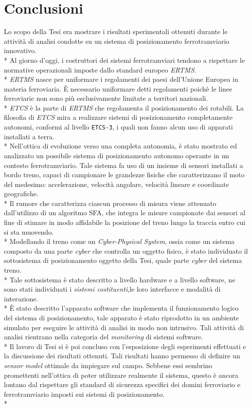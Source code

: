 \chapter{Conclusioni}
Lo scopo della Tesi era mostrare i risultati sperimentali ottenuti durante le attivit\`a di analisi condotte su un sistema di posizionamento ferrotramviario innovativo.\\*
Al giorno d'oggi, i costruttori dei sistemi ferrotramviari tendono a rispettare le normative operazionali imposte dallo standard europeo \emph{ERTMS}.\\*
\emph{ERTMS} nasce per uniformare i regolamenti dei paesi dell'Unione Europea in materia ferroviaria. \`E necessario uniformare detti regolamenti poich\`e le linee ferroviarie non sono pi\`u esclusivamente limitate a territori nazionali.\\*
\emph{ETCS} \`e la parte di \emph{ERTMS} che regolamenta il posizionamento dei rotabili. La filosofia di \emph{ETCS} mira a realizzare sistemi di posizionamento completamente autonomi, conformi al livello \texttt{ETCS-3}, i quali non fanno alcun uso di apparati installati a terra.\\*
Nell'ottica di evoluzione verso una completa autonomia, \`e stato mostrato ed analizzato un possibile sistema di posizionamento autonomo operante in un contesto ferrotramviario. Tale sistema fa uso di un insieme di sensori installati a bordo treno, capaci di campionare le grandezze fisiche che caratterizzano il moto del medesimo: accelerazione, velocit\`a angolare, velocit\`a lineare e coordinate geografiche.\\*
Il rumore che caratterizza ciascun processo di misura viene attenuato dall'utilizzo di un algoritmo SFA, che integra le misure campionate dai sensori al fine di stimare in modo affidabile la posizione del treno lungo la traccia entro cui si sta muovendo.\\*
Modellando il treno come un \emph{Cyber-Physical System}, ossia come un sistema composto da una parte \emph{cyber} che controlla un oggetto fisico, \`e stato individuato il sottosistema di posizionamento oggetto della Tesi, quale parte \emph{cyber} del sistema treno.\\*
Tale sottosistema \`e stato descritto a livello hardware e a livello software, ne sono stati individuati i \emph{sistemi costituenti},le loro interfacce e modalit\`a di interazione.\\*
\`E stato descritto l'apparato software che implementa il funzionamento logico del sistema di posizionamento, tale apparato \`e stato riprodotto in un ambiente simulato per eseguire le attivit\`a di analisi in modo non intrusivo. Tali attivit\`a di analisi rientrano nella categoria del \emph{monitoring} di sistemi software.\\*
Il lavoro di Tesi si \`e poi concluso con l'esposizione degli esperimenti effettuati e la discussione dei risultati ottenuti. Tali risultati hanno permesso di definire un \emph{sensor model} ottimale da impiegare sul campo. Sebbene essi sembrino promettenti nell'ottica di poter utilizzare realmente il sistema, questo \`e ancora lontano dal rispettare gli standard di sicurezza specifici dei domini ferroviario e ferrotramviario imposti sui sistemi di posizionamento.\\* 